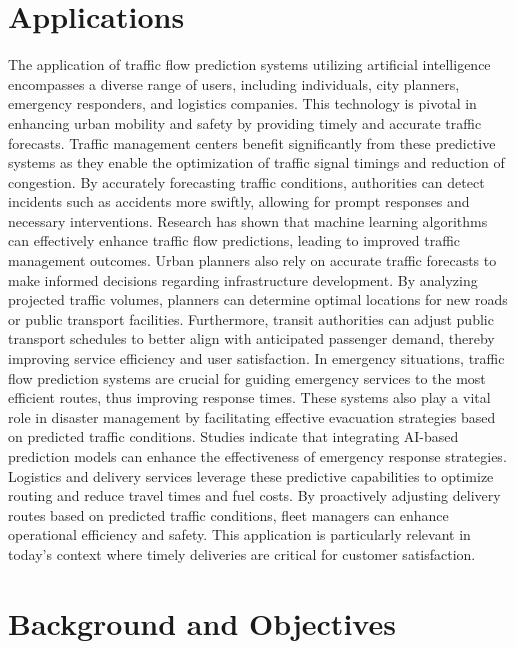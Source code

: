 \documentclass[conference]{IEEEtran}
\begin{document}
\section{Applications}
The application of traffic flow prediction systems utilizing artificial intelligence encompasses a diverse range of users, including individuals, city planners, emergency responders, and logistics companies. This technology is pivotal in enhancing urban mobility and safety by providing timely and accurate traffic forecasts.
Traffic management centers benefit significantly from these predictive systems as they enable the optimization of traffic signal timings and reduction of congestion. By accurately forecasting traffic conditions, authorities can detect incidents such as accidents more swiftly, allowing for prompt responses and necessary interventions. Research has shown that machine learning algorithms can effectively enhance traffic flow predictions, leading to improved traffic management outcomes\cite{ppr25}.
Urban planners also rely on accurate traffic forecasts to make informed decisions regarding infrastructure development. By analyzing projected traffic volumes, planners can determine optimal locations for new roads or public transport facilities. Furthermore, transit authorities can adjust public transport schedules to better align with anticipated passenger demand, thereby improving service efficiency and user satisfaction\cite{ppr26}.
In emergency situations, traffic flow prediction systems are crucial for guiding emergency services to the most efficient routes, thus improving response times. These systems also play a vital role in disaster management by facilitating effective evacuation strategies based on predicted traffic conditions. Studies indicate that integrating AI-based prediction models can enhance the effectiveness of emergency response strategies.
Logistics and delivery services leverage these predictive capabilities to optimize routing and reduce travel times and fuel costs. By proactively adjusting delivery routes based on predicted traffic conditions, fleet managers can enhance operational efficiency and safety. This application is particularly relevant in today's context where timely deliveries are critical for customer satisfaction\cite{ppr26}.


\section{Background and Objectives}
\end{document}
